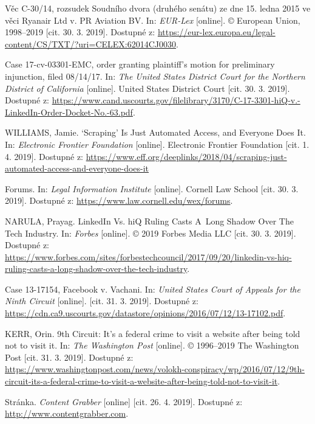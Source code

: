 \documentclass[thesis=B,czech]{FITthesis}[2012/06/26]
\begin{document}
\begin{thebibliography}{99}
	Věc C-30/14, rozsudek Soudního dvora (druhého senátu) ze dne 15. ledna 2015 ve věci Ryanair Ltd v. PR Aviation BV. In: \textit{EUR-Lex} [online]. © European Union, 1998--2019 [cit. 30. 3. 2019]. Dostupné z: \url{https://eur-lex.europa.eu/legal-content/CS/TXT/?uri=CELEX:62014CJ0030}.
	
	Case 17-cv-03301-EMC, order granting plaintiff's motion for preliminary injunction, filed 08/14/17. In: \textit{The United States District Court for the Northern District of California} [online]. United States District Court [cit. 30. 3. 2019]. Dostupné z: \url{https://www.cand.uscourts.gov/filelibrary/3170/C-17-3301-hiQ-v.-LinkedIn-Order-Docket-No.-63.pdf}.
	
	WILLIAMS, Jamie. ‘Scraping’ Is Just Automated Access, and Everyone Does It. In: \textit{Electronic Frontier Foundation} [online]. Electronic Frontier Foundation [cit. 1. 4. 2019]. Dostupné z: \url{https://www.eff.org/deeplinks/2018/04/scraping-just-automated-access-and-everyone-does-it}
	
	Forums. In: \textit{Legal Information Institute} [online]. Cornell Law School [cit. 30. 3. 2019]. Dostupné z: \url{https://www.law.cornell.edu/wex/forums}.
	
	NARULA, Prayag. LinkedIn Vs. hiQ Ruling Casts A~Long Shadow Over The Tech Industry. In: \textit{Forbes} [online]. © 2019 Forbes Media LLC [cit. 30. 3. 2019]. Dostupné z: \url{https://www.forbes.com/sites/forbestechcouncil/2017/09/20/linkedin-vs-hiq-ruling-casts-a-long-shadow-over-the-tech-industry}.
	
	Case 13-17154, Facebook v. Vachani. In: \textit{United States Court of Appeals for the Ninth Circuit} [online]. [cit. 31. 3. 2019]. Dostupné z: \url{https://cdn.ca9.uscourts.gov/datastore/opinions/2016/07/12/13-17102.pdf}.
	
	KERR, Orin. 9th Circuit: It’s a federal crime to visit a website after being told not to visit it. In: \textit{The Washington Post} [online]. © 1996--2019 The Washington Post [cit. 31. 3. 2019]. Dostupné z: \url{https://www.washingtonpost.com/news/volokh-conspiracy/wp/2016/07/12/9th-circuit-its-a-federal-crime-to-visit-a-website-after-being-told-not-to-visit-it}.
	
	Stránka. \textit{Content Grabber} [online] [cit. 26. 4. 2019]. Dostupné z: \url{http://www.contentgrabber.com}.
	

\end{thebibliography}
\end{document}
